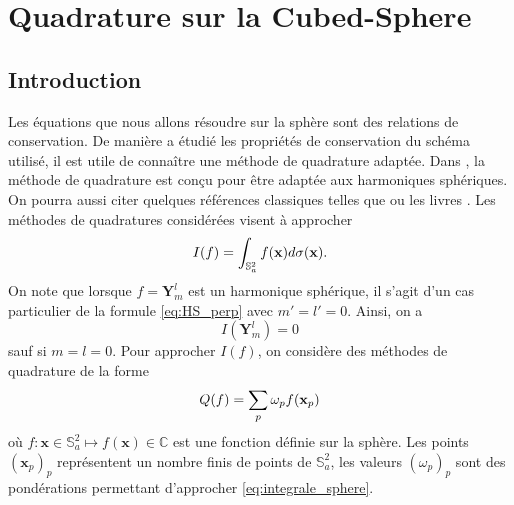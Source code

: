 \chapter{Quadrature sur la Cubed-Sphere}
\label{chap:quadrature}

\section{Introduction}

Les équations que nous allons résoudre sur la sphère sont des relations de conservation. De manière a étudié les propriétés de conservation du schéma utilisé, il est utile de connaître une méthode de quadrature adaptée. Dans \cite{Ahrens2009, Fornberg2014}, la méthode de quadrature est conçu pour être adaptée aux harmoniques sphériques. On pourra aussi citer quelques références classiques telles que \cite{Mclaren1963} ou les livres \cite{Atkinson2012, Hesse2010}. Les méthodes de quadratures considérées visent à approcher
\begin{equation}
I(f) = \displaystyle\int_{\mathbb{S}_a^2} f(\mathbf{x}) d \sigma(\mathbf{x}).
\label{eq:integrale_sphere}
\end{equation}
On note que lorsque $f = \mathbf{Y}_m^l$ est un harmonique sphérique, il s'agit d'un cas particulier de la formule \eqref{eq:HS_perp} avec $m'=l'=0$. Ainsi, on a 
\begin{equation}
I(\mathbf{Y}_m^l) = 0
\end{equation}
sauf si $m=l=0$.
Pour approcher $I(f)$, on considère des méthodes de quadrature de la forme
\begin{equation}
Q(f) = \displaystyle\sum\limits_p \omega_p f(\mathbf{x}_p)
\label{eq:quadrature_sphere}
\end{equation}
où $f : \mathbf{x} \in \mathbb{S}_a^2 \mapsto f(\mathbf{x}) \in \mathbb{C}$ est une fonction définie sur la sphère. Les points $(\mathbf{x}_p)_p$ représentent un nombre finis de points de $\mathbb{S}_a^2$, les valeurs $(\omega_p)_p$ sont des pondérations permettant d'approcher \eqref{eq:integrale_sphere}.

